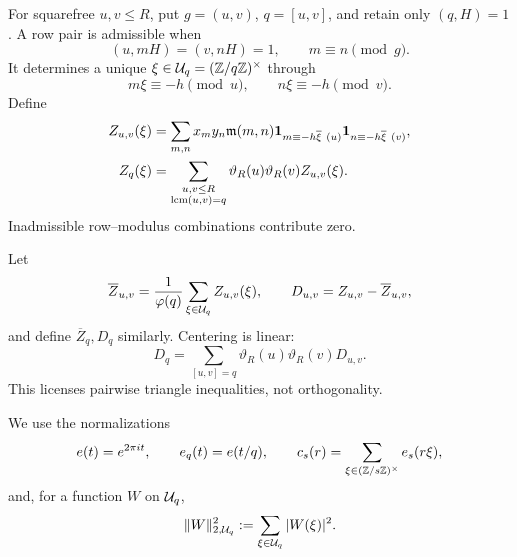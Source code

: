 For squarefree \(u,v\le R\), put \(g=(u,v)\), \(q=[u,v]\), and retain
only \((q,H)=1\).  A row pair is admissible when
\begin{equation}
 (u,mH)=(v,nH)=1,\qquad m\equiv n\pmod g.
 \label{eq:pair-admissibility}
\end{equation}
It determines a unique \(\xi\in\mathcal U_q=(\mathbb Z/q\mathbb Z)^\times\) through
\begin{equation}
 m\xi\equiv-h\pmod u,\qquad n\xi\equiv-h\pmod v.
 \label{eq:joint-class}
\end{equation}
Define
\begin{align}
 Z_{u,v}(\xi)&=\sum_{m,n}x_my_n\mathfrak m(m,n)
 \mathbf 1_{m\equiv-h\overline\xi\ (u)}
 \mathbf 1_{n\equiv-h\overline\xi\ (v)},
 \label{eq:pair-fiber}\\
 Z_q(\xi)&=\sum_{\substack{u,v\le R\\\operatorname{lcm}(u,v)=q}}
 \vartheta_R(u)\vartheta_R(v)Z_{u,v}(\xi).
 \label{eq:lcm-fiber}
\end{align}
Inadmissible row--modulus combinations contribute zero.

Let
\begin{equation}
 \overline Z_{u,v}=\frac1{\varphi(q)}\sum_{\xi\in\mathcal U_q}Z_{u,v}(\xi),
 \qquad D_{u,v}=Z_{u,v}-\overline Z_{u,v},
 \label{eq:pair-centering}
\end{equation}
and define \(\overline Z_q,D_q\) similarly.  Centering is linear:
\begin{equation}
 D_q=\sum_{[u,v]=q}\vartheta_R(u)\vartheta_R(v)D_{u,v}.
 \label{eq:centered-pair-sum}
\end{equation}
This licenses pairwise triangle inequalities, not orthogonality.

We use the normalizations
\begin{equation}
 e(t)=e^{2\pi i t},\qquad e_q(t)=e(t/q),\qquad
 c_s(r)=\sum_{\xi\in(\mathbb Z/s\mathbb Z)^\times}e_s(r\xi),
 \label{eq:additive-normalizations}
\end{equation}
and, for a function \(W\) on \(\mathcal U_q\),
\begin{equation}
 \|W\|_{2,\mathcal U_q}^2
 :=\sum_{\xi\in\mathcal U_q}|W(\xi)|^2.
 \label{eq:unnormalized-fiber-norm}
\end{equation}

